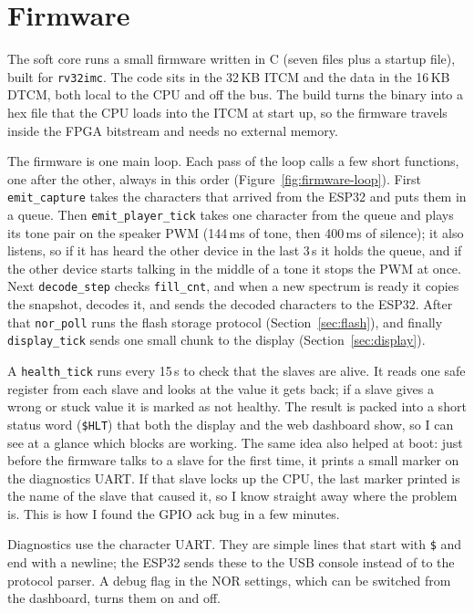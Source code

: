 \documentclass[a4paper,10pt]{article}
\begin{document}
\section{Firmware}
\label{sec:firmware}

The soft core runs a small firmware written in C (seven files plus a startup file), built
for \texttt{rv32imc}. The code sits in the 32\,KB ITCM and the data in the 16\,KB DTCM, both
local to the CPU and off the bus. The build turns the binary into a hex file that the CPU
loads into the ITCM at start up, so the firmware travels inside the FPGA bitstream and needs
no external memory.

The firmware is one main loop. Each pass of the loop calls a few short functions, one after
the other, always in this order (Figure~\ref{fig:firmware-loop}). First \texttt{emit\_capture}
takes the characters that arrived from the ESP32 and puts them in a queue. Then
\texttt{emit\_player\_tick} takes one character from the queue and plays its tone pair on the
speaker PWM (144\,ms of tone, then 400\,ms of silence); it also listens, so if it has heard
the other device in the last 3\,s it holds the queue, and if the other device starts talking
in the middle of a tone it stops the PWM at once. Next \texttt{decode\_step} checks
\texttt{fill\_cnt}, and when a new spectrum is ready it copies the snapshot, decodes it, and
sends the decoded characters to the ESP32. After that \texttt{nor\_poll} runs the flash
storage protocol (Section~\ref{sec:flash}), and finally \texttt{display\_tick} sends one small
chunk to the display (Section~\ref{sec:display}).

A \texttt{health\_tick} runs every 15\,s to check that the slaves are alive. It reads one safe
register from each slave and looks at the value it gets back; if a slave gives a wrong or
stuck value it is marked as not healthy. The result is packed into a short status word
(\texttt{\$HLT}) that both the display and the web dashboard show, so I can see at a glance
which blocks are working. The same idea also helped at boot: just before the firmware talks
to a slave for the first time, it prints a small marker on the diagnostics UART. If that
slave locks up the CPU, the last marker printed is the name of the slave that caused it, so I
know straight away where the problem is. This is how I found the GPIO ack bug in a few
minutes.

Diagnostics use the character UART. They are simple lines that start with \texttt{\$} and end
with a newline; the ESP32 sends these to the USB console instead of to the protocol parser. A
debug flag in the NOR settings, which can be switched from the dashboard, turns them on and
off.
\end{document}
